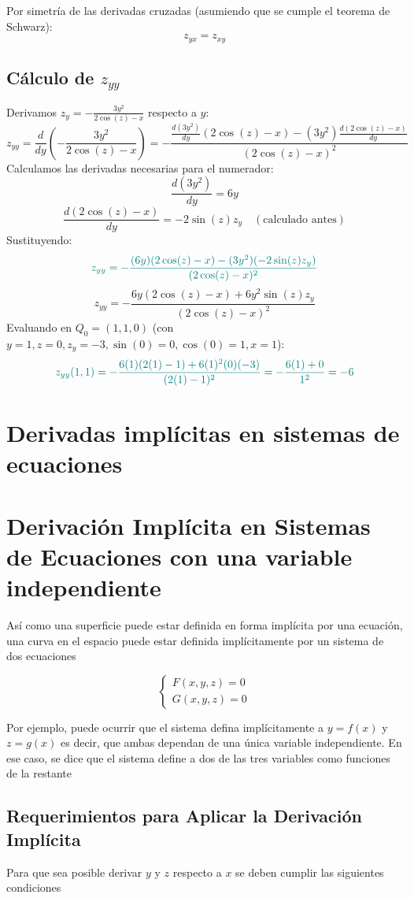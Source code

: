 \documentclass{article}
\begin{document}
Por simetría de las derivadas cruzadas (asumiendo que se cumple el teorema de Schwarz):
\[
z_{yx} = z_{xy}
\]

\subsection*{Cálculo de \( z_{yy} \)}
Derivamos \( z_y = -\frac{3y^2}{2\cos(z) - x} \) respecto a \( y \):
\[ z_{yy} = \frac{d}{dy}\left(-\frac{3y^2}{2\cos(z) - x}\right) = - \frac{\frac{d(3y^2)}{dy} (2\cos(z) - x) - (3y^2) \frac{d(2\cos(z) - x)}{dy}}{(2\cos(z) - x)^2} \]
Calculamos las derivadas necesarias para el numerador:
\[ \frac{d(3y^2)}{dy} = 6y \]
\[ \frac{d(2\cos(z) - x)}{dy} = -2\sin(z) z_y \quad (\text{calculado antes}) \]
Sustituyendo:
\[\color{teal} z_{yy} = - \frac{(6y)(2\cos(z) - x) - (3y^2)(-2\sin(z) z_y)}{(2\cos(z) - x)^2} \]
\[ z_{yy} = - \frac{6y(2\cos(z) - x) + 6y^2 \sin(z) z_y}{(2\cos(z) - x)^2} \]
Evaluando en \( Q_0 = (1,1,0) \) (con \( y=1, z=0, z_y=-3, \sin(0)=0, \cos(0)=1, x=1 \)):
\[\color{teal} z_{yy}(1,1) = - \frac{6(1)(2(1) - 1) + 6(1)^2 (0) (-3)}{(2(1) - 1)^2} = - \frac{6(1) + 0}{1^2} = -6 \]

\newpage
\section{Derivadas implícitas en sistemas de ecuaciones}



\section*{Derivación Implícita en Sistemas de Ecuaciones con una variable independiente}

Así como una superficie puede estar definida en forma implícita por una ecuación, una curva en el espacio puede estar definida implícitamente por un sistema de dos ecuaciones

\[
\begin{cases}
F(x,y,z) = 0 \\
G(x,y,z) = 0
\end{cases}
\]

Por ejemplo, puede ocurrir que el sistema defina implícitamente a \( y = f(x) \) y \( z = g(x) \) es decir, que ambas dependan de una única variable independiente. En ese caso, se dice que el sistema define a dos de las tres variables como funciones de la restante

\subsection*{Requerimientos para Aplicar la Derivación Implícita}
Para que sea posible derivar \( y \) y \( z \) respecto a \( x \) se deben cumplir las siguientes condiciones
\end{document}
